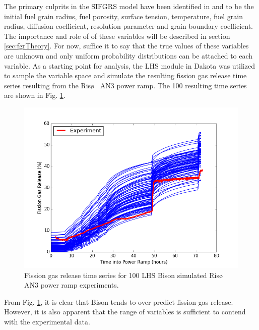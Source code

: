 The primary culprits in the \ac{SIFGRS} model have been identified in \cite{Swiler3} and \cite{Pastore} to be the initial fuel grain radius, fuel porosity, surface tension, temperature, fuel grain radius, diffusion coefficient, resolution parameter and grain boundary coefficient. The importance and role of of these variables will be described in section \ref{sec:fgrTheory}. For now, suffice it to say that the true values of these variables are unknown and only uniform probability distributions can be attached to each variable. As a starting point for analysis, the \ac{LHS} module in Dakota was utilized to sample the variable space and simulate the resulting fission gas release time series resulting from the Ris\o~ AN3 power ramp. The 100 resulting time series are shown in Fig. \ref{fig:fgrSimulations}.
\begin{figure}
\caption{\label{fig:fgrSimulations}
Fission gas release time series for 100 \ac{LHS} Bison simulated Ris\o~ AN3 power ramp experiments.}
 \begin{center}
  \includegraphics[scale=.75]{./Chapter4/fgr_simulations.png}
 \end{center}
\end{figure}
From Fig. \ref{fig:fgrSimulations}, it is clear that Bison tends to over predict fission gas release. However, it is also apparent that the range of variables is sufficient to contend with the experimental data.

